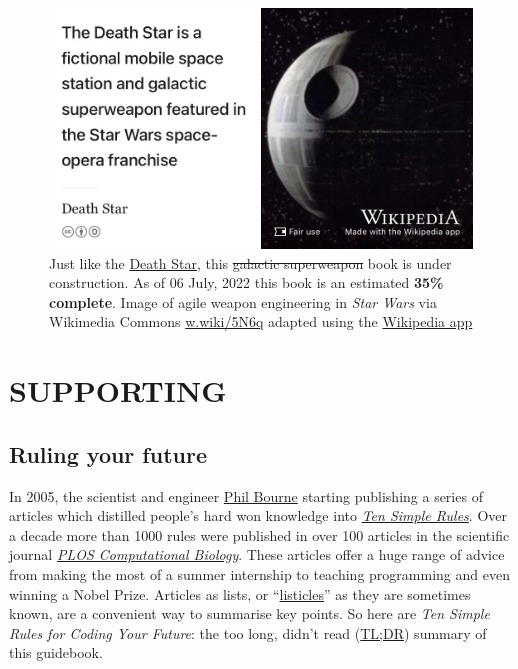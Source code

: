 \documentclass[
]{book}
\begin{document}
\begin{figure}

{\centering \includegraphics[width=0.99\linewidth]{images/DeathStar2} 

}

\caption{Just like the \href{https://en.wikipedia.org/wiki/Death_Star}{Death Star}, this \sout{galactic superweapon} book is under construction. As of 06 July, 2022 this book is an estimated \textbf{35\% complete}. Image of agile weapon engineering in \emph{Star Wars} via Wikimedia Commons \href{https://w.wiki/5N6q}{w.wiki/5N6q} adapted using the \href{https://apps.apple.com/gb/app/wikipedia/id324715238}{Wikipedia app}}\label{fig:deathstar9-fig}
\end{figure}

\hypertarget{part-supporting}{%
\part{SUPPORTING}\label{part-supporting}}

\hypertarget{ruling}{%
\chapter{Ruling your future}\label{ruling}}

In 2005, the scientist and engineer \href{https://en.wikipedia.org/wiki/Philip_Bourne}{Phil Bourne} starting publishing a series of articles which distilled people's hard won knowledge into \emph{\href{https://collections.plos.org/ten-simple-rules}{Ten Simple Rules}}. \citep{Bourne2005} Over a decade more than 1000 rules were published in over 100 articles in the scientific journal \emph{\href{https://en.wikipedia.org/wiki/PLOS_Computational_Biology}{PLOS Computational Biology}}. \citep{Bourne2018} These articles offer a huge range of advice from making the most of a summer internship \citep{Aicher2017} to teaching programming \citep{tensimplebrown} and even winning a Nobel Prize. \citep{Roberts2015} Articles as lists, or ``\href{https://en.wikipedia.org/wiki/Listicle}{listicles}'' as they are sometimes known, are a convenient way to summarise key points. So here are \emph{Ten Simple Rules for Coding Your Future}: the too long, didn't read (\href{https://en.wiktionary.org/wiki/too_long;_didn\%27t_read}{TL;DR}) summary of this guidebook.
\end{document}
